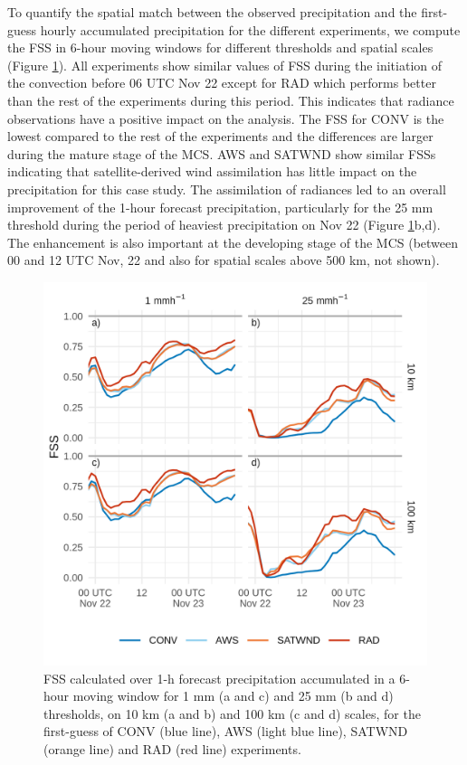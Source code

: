 \documentclass[authoryear,preprint,review,12pt]{elsarticle} %
\begin{document}
To quantify the spatial match between the observed precipitation and the first-guess hourly accumulated precipitation for the different experiments, we compute the FSS in 6-hour moving windows for different thresholds and spatial scales (Figure \ref{fig:fss}). All experiments show similar values of FSS during the initiation of the convection before 06 UTC Nov 22 except for RAD which performs better than the rest of the experiments during this period. This indicates that radiance observations have a positive impact on the analysis. The FSS for CONV is the lowest compared to the rest of the experiments and the differences are larger during the mature stage of the MCS. AWS and SATWND show similar FSSs indicating that satellite-derived wind assimilation has little impact on the precipitation for this case study. The assimilation of radiances led to an overall improvement of the 1-hour forecast precipitation, particularly for the 25 mm threshold during the period of heaviest precipitation on Nov 22 (Figure \ref{fig:fss}b,d). The enhancement is also important at the developing stage of the MCS (between 00 and 12 UTC Nov, 22 and also for spatial scales above 500 km, not shown).



\begin{figure}
\centering
\includegraphics{../figures/fss-1.png}
\caption{\label{fig:fss}FSS calculated over 1-h forecast precipitation accumulated in a 6-hour moving window for 1 mm (a and c) and 25 mm (b and d) thresholds, on 10 km (a and b) and 100 km (c and d) scales, for the first-guess of CONV (blue line), AWS (light blue line), SATWND (orange line) and RAD (red line) experiments.}
\end{figure}
\end{document}
